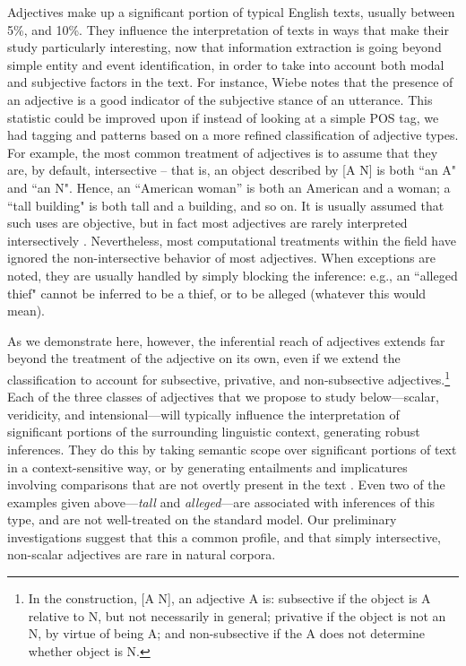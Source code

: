 \documentclass[10pt]{article}
\begin{document}
Adjectives make up a significant portion of typical English texts, usually between 5\%, and 10\%. They influence the interpretation of texts in ways that make their study particularly interesting, now that information extraction is going beyond simple entity and event identification, in order to take into account both modal and subjective factors in the text. For instance, Wiebe \cite{wiebe2000learning} notes that the presence of an adjective is a good indicator of the subjective stance of an utterance. This statistic could be improved upon if instead of looking at a simple POS tag, we had  tagging and patterns based on a more refined  classification of adjective types. For example, the most common treatment of adjectives is to assume that they are, by default, {\sc intersective} -- that is, an  object described by [A N] is both ``an A" and ``an N". Hence, an ``American woman'' is both an American and a woman; a ``tall building" is both tall and a building, and so on. 
It is usually assumed that such uses are objective, but in fact most adjectives are rarely interpreted intersectively \cite{giegerich2005associative}. Nevertheless, most computational treatments  within the field have ignored the non-intersective behavior of most adjectives.   When exceptions are noted, they are usually handled by simply blocking the inference: e.g., an ``alleged thief" cannot be inferred to be a thief, or to be alleged (whatever this would mean). 

As we demonstrate here, however,  the inferential reach of adjectives extends far beyond the treatment of the adjective on its own,  even if we extend the classification to  account for subsective, privative, and non-subsective adjectives.\footnote{
In the construction, [A N], an adjective A is:  {\sc subsective} if the object is A relative to N, but not necessarily in general; {\sc privative} if the object 
 is not an N, by virtue of being A; and 
 {\sc non-subsective} if the A  does not determine whether object is N.}
 Each of the three classes of adjectives that we propose to study below---scalar, veridicity, and intensional---will typically influence the interpretation of significant portions of the surrounding linguistic context, generating robust inferences. They do this by taking semantic scope over significant portions of text in a context-sensitive way, or by generating entailments and implicatures involving comparisons that are not overtly present in the text \cite{lassiter14adjectives}. 
%
Even two of the examples given above---\emph{tall} and \emph{alleged}---are associated with inferences of this type, and are not well-treated on the standard model. Our preliminary investigations suggest that this a common profile, and that simply intersective, non-scalar adjectives are rare in natural corpora.
\end{document}
